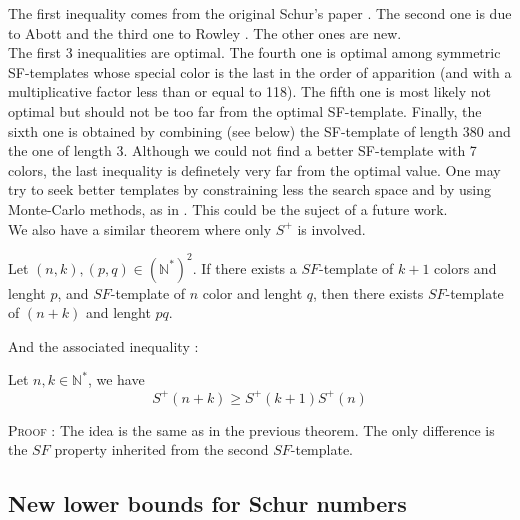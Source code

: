 The first inequality comes from the original Schur's paper \cite{Schur1917}. The second one is due to
Abott \cite{AbbottHanson}
and the third one to Rowley \cite{RowleyRamsey}. The other ones are new. \\

The first 3 inequalities are optimal. The fourth one is optimal among symmetric SF-templates whose special color is 
the last in the order of apparition (and with a multiplicative factor less than or equal to 118). The fifth one is most 
likely not optimal but should not be too far from the optimal SF-template. 
Finally, the sixth one is obtained by combining (see below) the SF-template of length 380 and the one of length 3. 
Although we could not find a better SF-template with 7 colors, the last inequality is definetely very far from the 
optimal value. One may try to seek better templates by constraining less the search space and by using 
Monte-Carlo methods, as in \cite{Bouzy2015AnAP}. This could be the suject of a future work.\\

We also have a similar theorem where only \(S^+\) is involved.

\begin{theorem}
	Let \((n,k), (p,q) \in (\mathbb{N}^*)^2\). If there exists a \(SF\)-template of \(k+1\) colors and lenght \(p\),
	and \(SF\)-template of \(n\) color and lenght \(q\), then there exists \(SF\)-template of \((n+k)\) and lenght \(pq\).
\end{theorem}

And the associated inequality :

\begin{corollary}
	Let \(n, k \in \mathbb{N}^*\), we have \\
	\[ S^+(n+k) \geqslant S^+(k+1)S^+(n) \]
\end{corollary}

\textsc{Proof :} The idea is the same as in the previous theorem. The only difference is the \(SF\) property inherited 
from the second \(SF\)-template.



\subsection{New lower bounds for Schur numbers}

